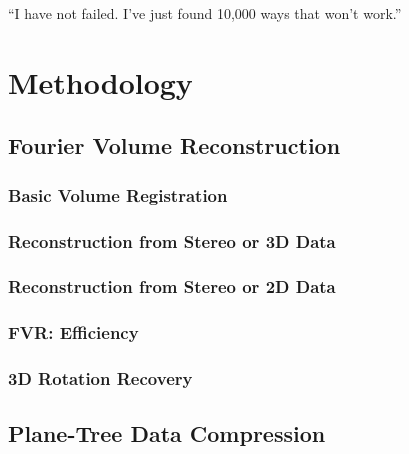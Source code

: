 \begin{savequote}[8cm]
  ``I have not failed. I've just found 10,000 ways that won't work.''
\end{savequote}
\makeatletter
\chapter{Methodology}
\label{ch:Metho}


\section{Fourier Volume Reconstruction}
\label{FVRSectionA}


\subsection{Basic Volume Registration} \label{Sec:VolumeRegistrationSection}


\subsection{Reconstruction from Stereo or 3D Data} \label{Sec:AFVRApproach}


\subsection{Reconstruction from Stereo or 2D Data} 
\label{Sec:AMonoFVRApproach}


\subsection{FVR: Efficiency} \label{Sec:Efficiency}


\subsection{3D Rotation Recovery}
\label{FullRecovery3DSection}




\section{Plane-Tree Data Compression}

